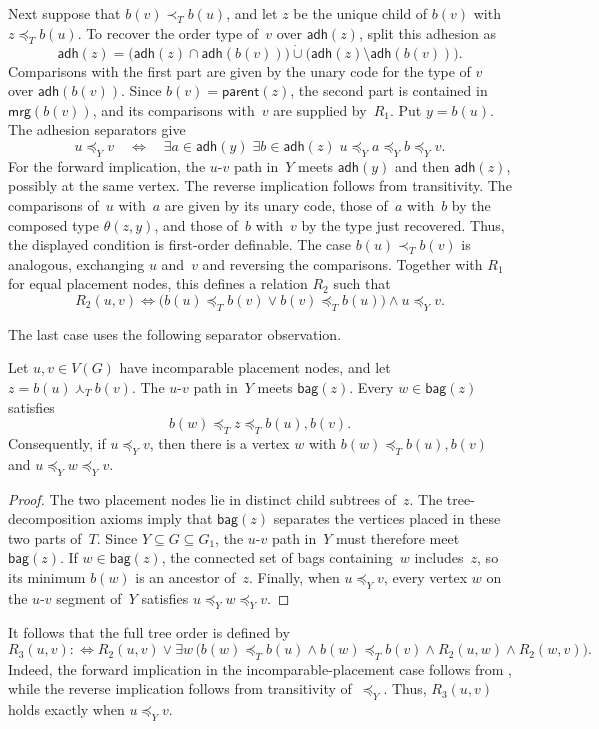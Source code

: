 \documentclass[1p,number,11pt]{elsarticle}
\theoremstyle{plain}
\newcommand{\bag}{\mathsf{bag}}
\newcommand{\mrg}{\mathsf{mrg}}
\newcommand{\adh}{\mathsf{adh}}
\newcommand{\parent}{\mathsf{parent}}
\begin{document}
Next suppose that $b(v)\prec_T b(u)$, and let $z$ be the unique child of $b(v)$ with $z\preceq_T b(u)$.
To recover the order type of~$v$ over $\adh(z)$, split this adhesion as
\[
 \adh(z)=
 \bigl(\adh(z)\cap\adh(b(v))\bigr)
 \mathbin{\dot\cup}
 \bigl(\adh(z)\setminus\adh(b(v))\bigr).
\]
Comparisons with the first part are given by the unary code for the type of $v$ over $\adh(b(v))$.
Since $b(v)=\parent(z)$, the second part is contained in $\mrg(b(v))$, and its comparisons with~$v$ are supplied by~$R_1$.
Put $y=b(u)$.
The adhesion separators give
\[
 u\preceq_Yv
 \quad\Longleftrightarrow\quad
 \exists a\in\adh(y)\;\exists b\in\adh(z)\;
 u\preceq_Ya\preceq_Yb\preceq_Yv.
\]
For the forward implication, the $u$-$v$ path in~$Y$ meets $\adh(y)$ and then $\adh(z)$, possibly at the same vertex.
The reverse implication follows from transitivity.
The comparisons of~$u$ with~$a$ are given by its unary code, those of~$a$ with~$b$ by the composed type $\theta(z,y)$, and those of~$b$ with~$v$ by the type just recovered.
Thus, the displayed condition is first-order definable.
The case $b(u)\prec_T b(v)$ is analogous, exchanging $u$ and~$v$ and reversing the comparisons.
Together with $R_1$ for equal placement nodes, this defines a relation $R_2$ such that
\[
 R_2(u,v)\Longleftrightarrow
 \bigl(b(u)\preceq_T b(v)\vee b(v)\preceq_T b(u)\bigr)
 \wedge u\preceq_Yv.
\]

The last case uses the following separator observation.
\begin{lemma}\label{lem:path-common-placement}
Let $u,v\in V(G)$ have incomparable placement nodes, and let $z=b(u)\curlywedge_T b(v)$.
The $u$-$v$ path in~$Y$ meets $\bag(z)$.
Every $w\in\bag(z)$ satisfies
\[
   b(w)\preceq_T z\preceq_T b(u),b(v).
\]
Consequently, if $u\preceq_Yv$, then there is a vertex $w$ with $b(w)\preceq_T b(u),b(v)$ and $u\preceq_Y w\preceq_Y v$.
\end{lemma}
\begin{proof}
The two placement nodes lie in distinct child subtrees of~$z$.
The tree-decomposition axioms imply that $\bag(z)$ separates the vertices placed in these two parts of~$T$.
Since $Y\subseteq G\subseteq G_1$, the $u$-$v$ path in~$Y$ must therefore meet~$\bag(z)$.
If $w\in\bag(z)$, the connected set of bags containing~$w$ includes~$z$, so its minimum $b(w)$ is an ancestor of~$z$.
Finally, when $u\preceq_Yv$, every vertex $w$ on the $u$-$v$ segment of~$Y$ satisfies $u\preceq_Y w\preceq_Y v$.
\end{proof}

It follows that the full tree order is defined by
\[
 R_3(u,v):\Longleftrightarrow
 R_2(u,v)\vee
 \exists w\,
 \bigl(b(w)\preceq_T b(u)\wedge b(w)\preceq_T b(v)
       \wedge R_2(u,w)\wedge R_2(w,v)\bigr).
\]
Indeed, the forward implication in the incomparable-placement case follows from , while the reverse implication follows from transitivity of~$\preceq_Y$.
Thus, $R_3(u,v)$ holds exactly when $u\preceq_Yv$.
\end{document}
